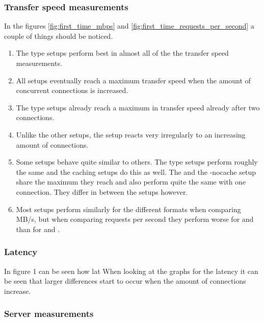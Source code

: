 \documentclass[twoside,openright]{uva-bachelor-thesis}
\begin{document}
\subsubsection{Transfer speed measurements}
In the figures \ref{fig:first_time_mbps} and
\ref{fig:first_time_requests_per_second} a couple of things should be noticed.
\begin{enumerate}
    \item
        The \cdn type setups perform best in almost all of the the transfer
        speed measurements.

    \item
        All setups eventually reach a maximum transfer speed when the amount of
        concurrent connections is increased.

    \item
        The \cdn type setups already reach a maximum in transfer speed already
        after two connections.

    \item
        Unlike the other setups, the \ipp setup reacts very irregularly to
        an increasing amount of connections.

    \item
        Some setups behave quite similar to others. The \cdn type setups perform
        roughly the same and the caching \lt setups do this as well. The \ipp
        and the \lt-nocache setup share the maximum they reach and also perform
        quite the same with one connection. They differ in between the setups
        however.

    \item
        Most setups perform similarly for the different formats when comparing
        MB/s, but when comparing requests per second they perform worse for \hds
        and \hls than for \dash and \iss.

\end{enumerate}



\subsubsection{Latency}
In figure 1 can be seen how lat
When looking at the graphs for the latency it can be seen that larger differences
start to occur when the amount of connections increase.

\subsubsection{Server measurements}



\clearpage
\end{document}
